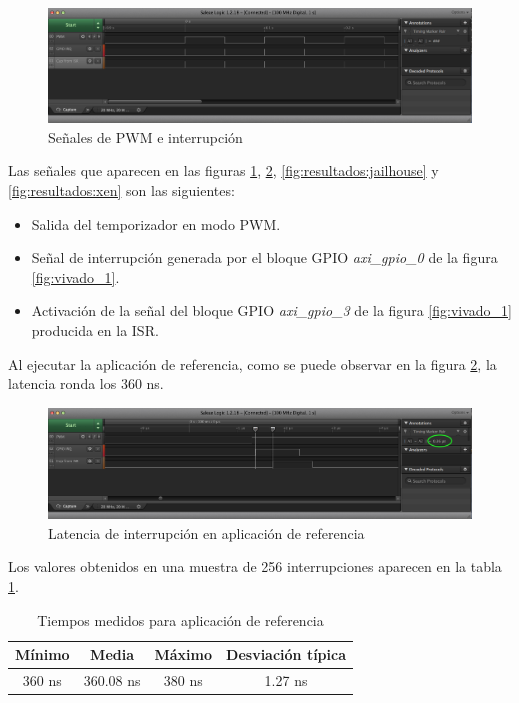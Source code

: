 \begin{figure}[h]
  \centering
  \includegraphics[width=1.0\textwidth]{recursos/baremetal_1.png}
  \caption{Señales de PWM e interrupción}
  \label{fig:resultados:baremetal_1}
\end{figure}

Las señales que aparecen en las figuras \ref{fig:resultados:baremetal_1}, \ref{fig:resultados:baremetal_2}, \ref{fig:resultados:jailhouse} y \ref{fig:resultados:xen} son las siguientes:
\begin{itemize}
  \item Salida del temporizador en modo \acrshort{PWM}.
  \item Señal de interrupción generada por el bloque \acrshort{GPIO} \textit{axi\_gpio\_0} de la figura \ref{fig:vivado_1}.
  \item Activación de la señal del bloque \acrshort{GPIO} \textit{axi\_gpio\_3} de la figura \ref{fig:vivado_1} producida en la \acrshort{ISR}.
\end{itemize}

Al ejecutar la aplicación de referencia, como se puede observar en la figura \ref{fig:resultados:baremetal_2}, la latencia ronda los 360 ns.\\

\begin{figure}[!h]
  \centering
  \includegraphics[width=1.0\textwidth]{recursos/baremetal_2.png}
  \caption{Latencia de interrupción en aplicación de referencia}
  \label{fig:resultados:baremetal_2}
\end{figure}

Los valores obtenidos en una muestra de 256 interrupciones aparecen en la tabla \ref{table:results_baremetal}. \\
\begin{table}[!ht]
  \centering
	\begin{tabular}{ |c|c|c|c| }
		\hline
    Mínimo          & Media      & Máximo  & Desviación típica  \\
    \hline
    360 ns         & 360.08 ns      & 380 ns    & 1.27 ns	   \\
    \hline
	\end{tabular}
	\caption{Tiempos medidos para aplicación de referencia}
  \label{table:results_baremetal}
\end{table}

